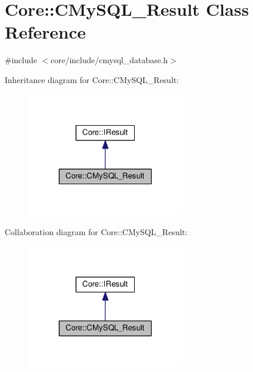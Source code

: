 \hypertarget{classCore_1_1CMySQL__Result}{}\section{Core\+:\+:C\+My\+S\+Q\+L\+\_\+\+Result Class Reference}
\label{classCore_1_1CMySQL__Result}


{\ttfamily \#include $<$core/include/cmysql\+\_\+database.\+h$>$}



Inheritance diagram for Core\+:\+:C\+My\+S\+Q\+L\+\_\+\+Result\+:\nopagebreak
\begin{figure}[H]
\begin{center}
\leavevmode
\includegraphics[width=198pt]{classCore_1_1CMySQL__Result__inherit__graph}
\end{center}
\end{figure}


Collaboration diagram for Core\+:\+:C\+My\+S\+Q\+L\+\_\+\+Result\+:\nopagebreak
\begin{figure}[H]
\begin{center}
\leavevmode
\includegraphics[width=198pt]{classCore_1_1CMySQL__Result__coll__graph}
\end{center}
\end{figure}
